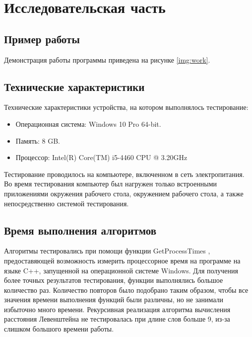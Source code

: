 \chapter{Исследовательская часть}

\section{Пример работы}

Демонстрация работы программы приведена на рисунке \ref{img:work}.


\section{Технические характеристики}

Технические характеристики устройства, на котором выполнялось тестирование:

\begin{itemize}
	\item Операционная система: Windows 10 Pro \cite{windows} 64-bit.
	\item Память: 8 GB.
	\item Процессор: Intel(R) Core(TM) i5-4460 \cite{Intel} CPU @ 3.20GHz
\end{itemize}

Тестирование проводилось на компьютере, включенном в сеть электропитания. Во время тестирования компьютер был нагружен только встроенными приложениями окружения рабочего стола, окружением рабочего стола, а также непосредственно системой тестирования.

\section{Время выполнения алгоритмов}

Алгоритмы тестировались при помощи функции GetProcessTimes \cite{GetProcessTimes}, предоставяющей возможность измерить процессорное время на программе на языке C++, запущенной на операционной системе Windows. Для получения более точных результатов тестирования, функции выполнялись большое количество раз. Количество повторов было подобрано таким образом, чтобы все значения времени выполнения функций были различны, но не занимали избыточно много времени. Рекурсивная реализация алгоритма вычисления расстояния Левенштейна не тестировалась при длине слов больше 9, из-за слишком большого времени работы.

